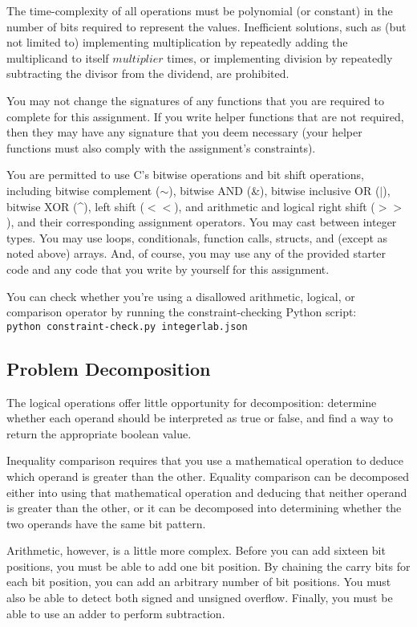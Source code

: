 The time-complexity of all operations must be polynomial (or constant) in the number of bits required to represent the values.
Inefficient solutions, such as (but not limited to) implementing multiplication by repeatedly adding the multiplicand to itself $multiplier$ times, or implementing division by repeatedly subtracting the divisor from the dividend, are prohibited.

You may not change the signatures of any functions that you are required to complete for this assignment.
If you write helper functions that are not required, then they may have any signature that you deem necessary
(your helper functions must also comply with the assignment's constraints).

You are permitted to use C's bitwise operations and bit shift operations, including bitwise complement ($\sim$), bitwise AND (\&), bitwise inclusive OR ($|$), bitwise XOR (\^{}), left shift ($<<$), and arithmetic and logical right shift ($>>$), and their corresponding assignment operators.
You may cast between integer types.
You may use loops, conditionals, function calls, structs, and (except as noted above) arrays.
And, of course, you may use any of the provided starter code and any code that you write by yourself for this assignment.

You can check whether you're using a disallowed arithmetic, logical, or comparison operator by running the constraint-checking Python script: \\
\texttt{python constraint-check.py integerlab.json}


\subsection{Problem Decomposition}

The logical operations offer little opportunity for decomposition: determine whether each operand should be interpreted as true or false, and find a way to return the appropriate boolean value.

Inequality comparison requires that you use a mathematical operation to deduce which operand is greater than the other.
Equality comparison can be decomposed either into using that mathematical operation and deducing that neither operand is greater than the other, or it can be decomposed into determining whether the two operands have the same bit pattern.

Arithmetic, however, is a little more complex.
Before you can add sixteen bit positions, you must be able to add one bit position.
By chaining the carry bits for each bit position, you can add an arbitrary number of bit positions.
You must also be able to detect both signed and unsigned overflow.
Finally, you must be able to use an adder to perform subtraction.

